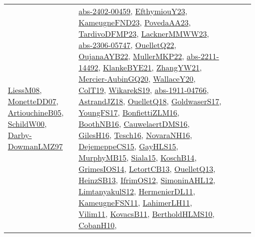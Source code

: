 {\begin{longtable}{llp{6cm}p{6cm}p{6cm}}
\href{articles/LiessM08.pdf}{LiessM08}\cite{LiessM08}, \href{papers/MonetteDD07.pdf}{MonetteDD07}\cite{MonetteDD07}, \href{papers/ArtiouchineB05.pdf}{ArtiouchineB05}\cite{ArtiouchineB05}, \href{articles/SchildW00.pdf}{SchildW00}\cite{SchildW00}, \href{articles/Darby-DowmanLMZ97.pdf}{Darby-DowmanLMZ97}\cite{Darby-DowmanLMZ97} & \href{articles/abs-2402-00459.pdf}{abs-2402-00459}\cite{abs-2402-00459}, \href{papers/EfthymiouY23.pdf}{EfthymiouY23}\cite{EfthymiouY23}, \href{papers/KameugneFND23.pdf}{KameugneFND23}\cite{KameugneFND23}, \href{papers/PovedaAA23.pdf}{PovedaAA23}\cite{PovedaAA23}, \href{papers/TardivoDFMP23.pdf}{TardivoDFMP23}\cite{TardivoDFMP23}, \href{articles/LacknerMMWW23.pdf}{LacknerMMWW23}\cite{LacknerMMWW23}, \href{articles/abs-2306-05747.pdf}{abs-2306-05747}\cite{abs-2306-05747}, \href{papers/OuelletQ22.pdf}{OuelletQ22}\cite{OuelletQ22}, \href{papers/OujanaAYB22.pdf}{OujanaAYB22}\cite{OujanaAYB22}, \href{articles/MullerMKP22.pdf}{MullerMKP22}\cite{MullerMKP22}, \href{articles/abs-2211-14492.pdf}{abs-2211-14492}\cite{abs-2211-14492}, \href{papers/KlankeBYE21.pdf}{KlankeBYE21}\cite{KlankeBYE21}, \href{articles/ZhangYW21.pdf}{ZhangYW21}\cite{ZhangYW21}, \href{papers/Mercier-AubinGQ20.pdf}{Mercier-AubinGQ20}\cite{Mercier-AubinGQ20}, \href{articles/WallaceY20.pdf}{WallaceY20}\cite{WallaceY20}, \href{papers/ColT19.pdf}{ColT19}\cite{ColT19}, \href{articles/WikarekS19.pdf}{WikarekS19}\cite{WikarekS19}, \href{articles/abs-1911-04766.pdf}{abs-1911-04766}\cite{abs-1911-04766}, \href{papers/AstrandJZ18.pdf}{AstrandJZ18}\cite{AstrandJZ18}, \href{papers/OuelletQ18.pdf}{OuelletQ18}\cite{OuelletQ18}, \href{papers/GoldwaserS17.pdf}{GoldwaserS17}\cite{GoldwaserS17}, \href{papers/YoungFS17.pdf}{YoungFS17}\cite{YoungFS17}, \href{papers/BonfiettiZLM16.pdf}{BonfiettiZLM16}\cite{BonfiettiZLM16}, \href{papers/BoothNB16.pdf}{BoothNB16}\cite{BoothNB16}, \href{papers/CauwelaertDMS16.pdf}{CauwelaertDMS16}\cite{CauwelaertDMS16}, \href{papers/GilesH16.pdf}{GilesH16}\cite{GilesH16}, \href{papers/Tesch16.pdf}{Tesch16}\cite{Tesch16}, \href{articles/NovaraNH16.pdf}{NovaraNH16}\cite{NovaraNH16}, \href{papers/DejemeppeCS15.pdf}{DejemeppeCS15}\cite{DejemeppeCS15}, \href{papers/GayHLS15.pdf}{GayHLS15}\cite{GayHLS15}, \href{papers/MurphyMB15.pdf}{MurphyMB15}\cite{MurphyMB15}, \href{articles/Siala15.pdf}{Siala15}\cite{Siala15}, \href{papers/KoschB14.pdf}{KoschB14}\cite{KoschB14}, \href{articles/GrimesIOS14.pdf}{GrimesIOS14}\cite{GrimesIOS14}, \href{papers/LetortCB13.pdf}{LetortCB13}\cite{LetortCB13}, \href{papers/OuelletQ13.pdf}{OuelletQ13}\cite{OuelletQ13}, \href{articles/HeinzSB13.pdf}{HeinzSB13}\cite{HeinzSB13}, \href{papers/IfrimOS12.pdf}{IfrimOS12}\cite{IfrimOS12}, \href{papers/SimoninAHL12.pdf}{SimoninAHL12}\cite{SimoninAHL12}, \href{articles/LimtanyakulS12.pdf}{LimtanyakulS12}\cite{LimtanyakulS12}, \href{papers/HermenierDL11.pdf}{HermenierDL11}\cite{HermenierDL11}, \href{papers/KameugneFSN11.pdf}{KameugneFSN11}\cite{KameugneFSN11}, \href{papers/LahimerLH11.pdf}{LahimerLH11}\cite{LahimerLH11}, \href{papers/Vilim11.pdf}{Vilim11}\cite{Vilim11}, \href{articles/KovacsB11.pdf}{KovacsB11}\cite{KovacsB11}, \href{papers/BertholdHLMS10.pdf}{BertholdHLMS10}\cite{BertholdHLMS10}, \href{papers/CobanH10.pdf}{CobanH10}\cite{CobanH10}, 
\end{longtable}}
